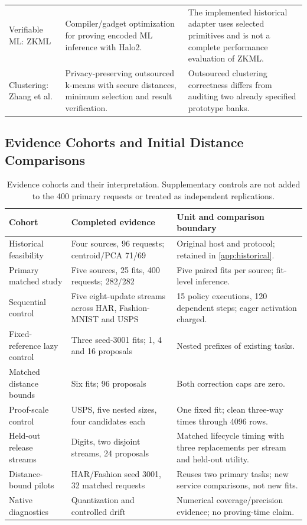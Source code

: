 \documentclass[5p,times,twocolumn]{elsarticle}
\begin{document}
\begin{table}[H]
\begin{tabularx}{\textwidth}{@{}p{}XX@{}}
Verifiable ML: ZKML~\cite{chen2024zkml} & Compiler/gadget optimization for proving encoded ML inference with Halo2. & The implemented historical adapter uses selected primitives and is not a complete performance evaluation of ZKML.\\
Clustering: Zhang et al.~\cite{zhang2021verifiable} & Privacy-preserving outsourced k-means with secure distances, minimum selection and result verification. & Outsourced clustering correctness differs from auditing two already specified prototype banks.\\
\bottomrule\end{tabularx}\end{table}

\subsection{Evidence Cohorts and Initial Distance Comparisons}
\begin{table}[H]
\centering\small
\caption{Evidence cohorts and their interpretation. Supplementary controls are
not added to the 400 primary requests or treated as independent replications.}
\label{tab:revision-cohorts}
\begin{tabularx}{\textwidth}{@{}p{}p{}X@{}}\toprule
Cohort & Completed evidence & Unit and comparison boundary\\\midrule
Historical feasibility & Four sources, 96 requests; centroid/PCA 71/69 & Original host and protocol; retained in \ref{app:historical}.\\
Primary matched study & Five sources, 25 fits, 400 requests; 282/282 & Five paired fits per source; fit-level inference.\\
Sequential control & Five eight-update streams across HAR, Fashion-MNIST and USPS & 15 policy executions, 120 dependent steps; eager activation charged.\\
Fixed-reference lazy control & Three seed-3001 fits; 1, 4 and 16 proposals & Nested prefixes of existing tasks.\\
Matched distance bounds & Six fits; 96 proposals & Both correction caps are zero.\\
Proof-scale control & USPS, five nested sizes, four candidates each & One fixed fit; clean three-way times through 4096 rows.\\
Held-out release streams & Digits, two disjoint streams, 24 proposals & Matched lifecycle timing with three replacements per stream and held-out utility.\\
Distance-bound pilots & HAR/Fashion seed 3001, 32 matched requests & Reuses two primary tasks; new service comparisons, not new fits.\\
Native diagnostics & Quantization and controlled drift & Numerical coverage/precision evidence; no proving-time claim.\\\bottomrule
\end{tabularx}
\end{table}
\end{document}
